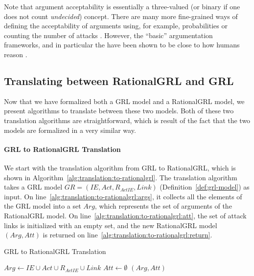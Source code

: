 Note that argument acceptability is essentially a three-valued (or binary if one does not count \emph{undecided}) concept. There are many more fine-grained ways of defining the acceptability of arguments using, for example, probabilities \cite{li2011probabilistic} or counting the number of attacks \cite{grossi2015graded}. However, the ``basic'' argumentation frameworks, and in particular the  have been shown to be close to how humans reason \cite{rahwan2010behavioral}. 

\subsection{Translating between RationalGRL and GRL}
\label{sect:formalframework:translation}

Now that we have formalized both a GRL model and a RationalGRL model, we present algorithms to translate between these two models. Both of these two translation algorithms are straightforward, which is result of the fact that the two models are formalized in a very similar way.

\paragraph{GRL to RationalGRL Translation} We start with the translation algorithm from GRL to RationalGRL, which is shown in Algorithm~\ref{alg:translation:to-rationalgrl}. The translation algorithm takes a GRL model $GR=(IE, Act, R_{ActIE}, Link)$ (Definition~\ref{def:grl-model}) as input. On line~\ref{alg:translation:to-rationalgrl:args}, it collects all the elements of the GRL model into a set $Arg$, which represents the set of arguments of the RationalGRL model. On line~\ref{alg:translation:to-rationalgrl:att}, the set of attack links is initialized with an empty set, and the new RationalGRL model $(Arg, Att)$ is returned on line~\ref{alg:translation:to-rationalgrl:return}.

\begin{algorithm}[ht]
  \caption{GRL to RationalGRL Translation}
  \label{alg:translation:to-rationalgrl}
  \begin{algorithmic}[1]
    \State $Arg \leftarrow IE\cup Act \cup R_{ActIE}\cup Link$\label{alg:translation:to-rationalgrl:args}
    \State $Att \leftarrow \emptyset$\label{alg:translation:to-rationalgrl:att}
    \State \Return $(Arg, Att)$\label{alg:translation:to-rationalgrl:return}
    \EndProcedure
  \end{algorithmic}
\end{algorithm}

